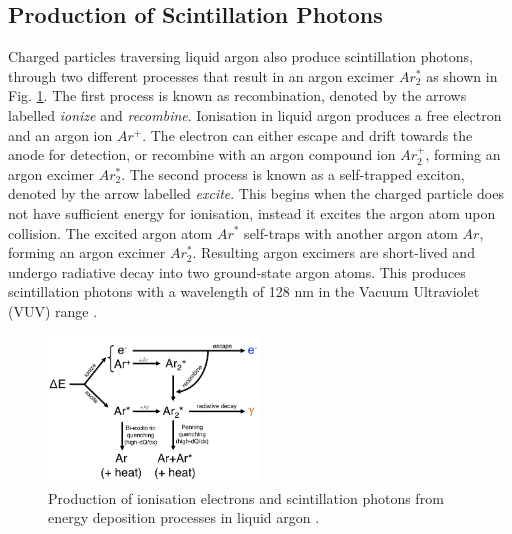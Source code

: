 \subsection{Production of Scintillation Photons}

\label{sec:scintillation}

Charged particles traversing liquid argon also produce scintillation photons, through two different processes that result in an argon excimer $Ar_{2}^{*}$ as shown in Fig. \ref{fig:recomb_diagram}.  
The first process is known as recombination, denoted by the arrows labelled \textit{ionize} and \textit{recombine}.
Ionisation in liquid argon produces a free electron and an argon ion $Ar^{+}$.
The electron can either escape and drift towards the anode for detection, or recombine with an argon compound ion $Ar_2^{+}$, forming an argon excimer $Ar_{2}^{*}$.
The second process is known as a self-trapped exciton, denoted by the arrow labelled \textit{excite}.
This begins when the charged particle does not have sufficient energy for ionisation, instead it excites the argon atom upon collision.
The excited argon atom $Ar^{*}$ self-traps with another argon atom $Ar$, forming an argon excimer $Ar_{2}^{*}$.
Resulting argon excimers are short-lived and undergo radiative decay into two ground-state argon atoms.
This produces scintillation photons with a wavelength of 128 nm in the Vacuum Ultraviolet (VUV) range \cite{Lariat}.

\begin{figure}[ht!] 
\centering    
\includegraphics[width=0.5\textwidth]{recomb_diagram}
\caption[Energy Deposition in Liquid Argon Diagram]{
Production of ionisation electrons and scintillation photons from energy deposition processes in liquid argon \cite{Lariat}.
}
\label{fig:recomb_diagram}
\end{figure}

